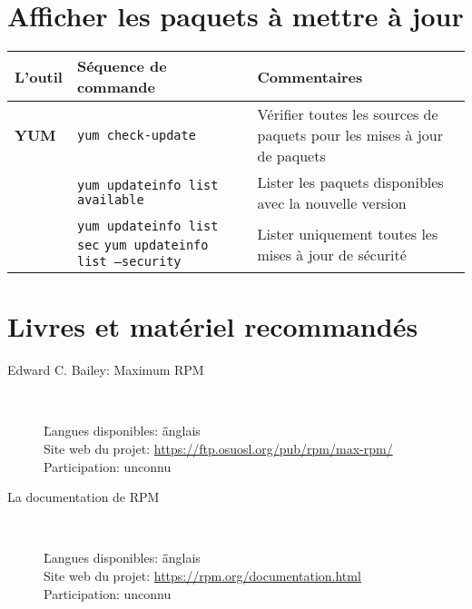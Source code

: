 \documentclass[10pt,a4paper]{article}
\newcommand{\tabellenkopf}{
  \textbf{L'outil} & \textbf{Séquence de commande} & \textbf{Commentaires} \\
}
\begin{document}
\section{Afficher les paquets à mettre à jour}
\begin{tabular}{ p{3.5cm} p{9cm} p{11cm}}
  \hline
  \rowcolor{Gray}
  \tabellenkopf
  \hline 
  \textbf{YUM} & \texttt{yum check-update} & Vérifier toutes les sources de paquets pour les mises à jour de paquets \\
  \rowcolor{Gray}
  & \texttt{yum updateinfo list available} & Lister les paquets disponibles avec la nouvelle version \\
  & \texttt{yum updateinfo list sec} \newline \texttt{yum updateinfo list --security} & Lister uniquement toutes les mises à jour de sécurité \\
  \hline
\end{tabular}

\section{Livres et matériel recommandés}

\begin{description}

    \item[Edward C. Bailey: Maximum RPM] ~ \\
        \begin{tabbing}
            \= Langues disponibles: \= \= anglais \\
            \> Site web du projet: \> \> \href{https://ftp.osuosl.org/pub/rpm/max-rpm/}{https://ftp.osuosl.org/pub/rpm/max-rpm/} \\
            \> Participation: \> \> unconnu \\
        \end{tabbing}
        
    \item[La documentation de RPM] ~ \\
        \begin{tabbing}
            \= Langues disponibles: \= \= anglais \\
            \> Site web du projet: \> \> \href{https://rpm.org/documentation.html}{https://rpm.org/documentation.html} \\
            \> Participation: \> \> unconnu \\
        \end{tabbing}
    \end{description}
\end{document}
